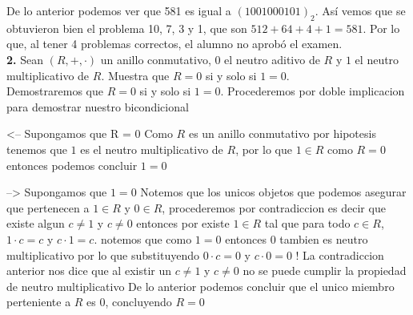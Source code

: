 \documentclass[12pt]{article}
\begin{document}
De lo anterior podemos ver que 581 es igual a $(1001000101)_2$. Así vemos que se obtuvieron bien el problema 10, 7, 3 y 1, que son 
$512 + 64 + 4 + 1 = 581$. Por lo que, al tener 4 problemas correctos, el alumno no aprobó el examen.\\
\vspace{1cm}
%
%
\textbf{2.} Sean $(R, +, ·)$ un anillo conmutativo, $0$ el neutro aditivo de $R$ y $1$ el neutro multiplicativo de $R$. Muestra
que $R = {0}$ si y solo si $1 = 0$. \\

Demostraremos que $R = {0}$ si y solo si $1 = 0$.
Procederemos por doble implicacion para demostrar nuestro bicondicional

<--
Supongamos que R = {0}
Como $R$ es un anillo conmutativo por hipotesis tenemos que $1$ es el neutro multiplicativo de $R$, por lo que $1 \in R$ como $R = {0}$ entonces podemos concluir
$1 = 0$

-->
Supongamos que $1 = 0$
Notemos que los unicos objetos que podemos asegurar que pertenecen a $1 \in R$ y $0 \in R$, procederemos por contradiccion es decir que existe algun $c \neq 1$ y $c \neq 0$ entonces
por existe $1 \in R$ tal que para todo $c \in R$, $1 · c = c$ y $c · 1 = c$.
notemos que como $1 = 0$ entonces $0$ tambien es neutro multiplicativo por lo que substituyendo
$0 · c = 0$ y $c · 0 = 0$ !
La contradiccion anterior nos dice que al existir un $c \neq 1$ y $c \neq 0$ no se puede cumplir la propiedad de neutro multiplicativo
De lo anterior podemos concluir que el unico miembro perteniente a $R$ es $0$, concluyendo $R = {0}$
\end{document}
